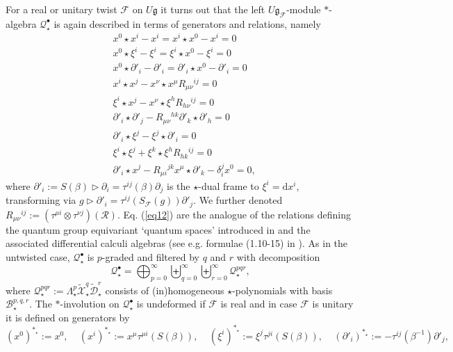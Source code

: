 \documentclass[a4paper,11pt]{article}
\begin{document}
For a real or unitary twist $\mathcal{F}$ on $U\mathfrak{g}$ it turns out that the
left $U\mathfrak{g}_\mathcal{F}$-module $*$-algebra $\mathcal{Q}^\bullet_\star$
is again described in terms of generators and relations, namely
\begin{equation}\label{eq12}
\begin{split}
    &x^0\star x^i-x^i=x^i\star x^0-x^i=0\\
    &x^0\star \xi^i-\xi^i=\xi^i\star x^0-\xi^i=0\\
    &x^0\star\partial'_i-\partial'_i=\partial'_i\star x^0-\partial'_i=0\\
    &x^i\star x^j-x^\nu\star x^\mu R_{\mu\nu}{}^{ij}=0\\
    &\xi^i\star x^j-x^\nu\star\xi^hR_{h\nu}{}^{ij}=0\\
    &\partial'_i\star\partial'_j-R_{\mu\nu}{}^{hk}\partial'_k\star\partial'_h=0\\
    &\partial'_i\star\xi^j-\xi^j\star\partial'_i=0\\
    &\xi^i\star\xi^j+\xi^k\star\xi^hR_{hk}{}^{ij}=0\\
    &\partial'_i\star x^j-R_{\mu i}{}^{jk}x^\mu\star\partial'_k-\delta_i^jx^0=0,
\end{split}
\end{equation}
where $\partial'_i:=S(\beta)\rhd\partial_i=\tau^{ij}(\beta)\partial_j$
is the $\star$-dual frame to $\xi^i=\mathrm{d}x^i$, transforming via
$g\rhd\partial'_i=\tau^{ij}(S_\mathcal{F}(g))\partial'_j$.
We further denoted 
$R_{\mu\nu}{}^{ij}:=(\tau^{\mu i}\otimes\tau^{\nu j})(\mathcal{R})$.
Eq. (\ref{eq12}) are the analogue of the  relations
 defining the quantum group equivariant `quantum spaces' introduced in \cite{FRT} and the associated differential calculi algebras (see e.g. formulae (1.10-15)
in \cite{Fio04JPA}). 
As in the untwisted case, $\mathcal{Q}^\bullet_\star$ is $p$-graded and
filtered by $q$ and $r$ with decomposition
\begin{equation}
    \mathcal{Q}^\bullet_\star=\bigoplus_{p=0}^\infty\biguplus_{q=0}^\infty
    \biguplus_{r=0}^\infty\mathcal{Q}^{pqr}_\star,
\end{equation}
where $\mathcal{Q}^{pqr}_\star:=\Lambda^p_\star\tilde{\mathcal{X}}^q_\star
\tilde{\mathcal{D}}^r_\star$ consists of (in)homogeneous $\star$-polynomials
with basis $\mathcal{B}^{p,q,r}_\star$. The $*$-involution on 
$\mathcal{Q}^\bullet_\star$ is undeformed if $\mathcal{F}$ is real and
in case $\mathcal{F}$ is unitary it is defined on generators by 
\begin{equation}
    (x^0)^{*_\star}:=x^0,~~~~~
    (x^i)^{*_\star}:=x^\mu\tau^{\mu i}(S(\beta)),~~~~~
    (\xi^i)^{*_\star}:=\xi^j\tau^{ji}(S(\beta)),~~~~~
    (\partial'_i)^{*_\star}:=-\tau^{ij}(\beta^{-1})\partial'_j,
\end{equation}
\end{document}
